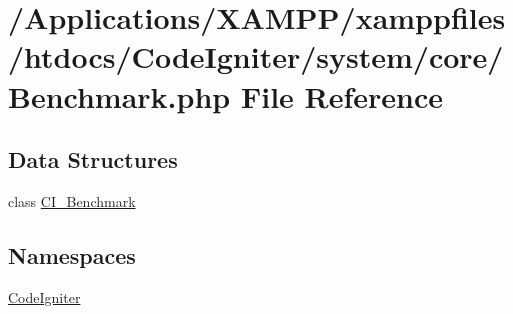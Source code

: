 \hypertarget{_benchmark_8php}{}\section{/\+Applications/\+X\+A\+M\+P\+P/xamppfiles/htdocs/\+Code\+Igniter/system/core/\+Benchmark.php File Reference}
\label{_benchmark_8php}
\subsection*{Data Structures}
\begin{DoxyCompactItemize}
\item 
class \mbox{\hyperlink{class_c_i___benchmark}{C\+I\+\_\+\+Benchmark}}
\end{DoxyCompactItemize}
\subsection*{Namespaces}
\begin{DoxyCompactItemize}
\item 
 \mbox{\hyperlink{namespace_code_igniter}{Code\+Igniter}}
\end{DoxyCompactItemize}
